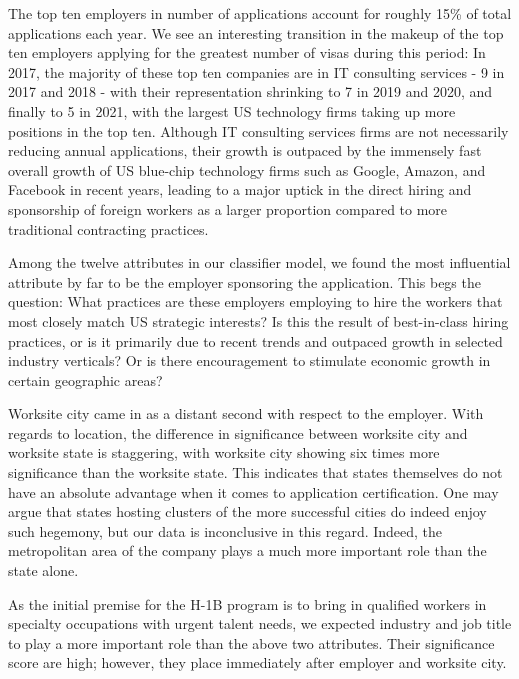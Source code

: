 \documentclass[sigconf]{acmart}
\begin{document}
The top ten employers in number of applications account for roughly 15\% of total applications each year. 
We see an interesting transition in the makeup of the top ten employers applying for the 
greatest number of visas during this period:
In 2017, the majority of these top ten companies are  
in IT consulting services - 9 in 2017 and 2018 - with their representation shrinking to 
7 in 2019 and 2020, and finally to 5 in 2021, with the largest US technology firms taking up more positions 
in the top ten. Although IT consulting services firms are not necessarily reducing annual applications, 
their growth is outpaced by 
the immensely fast overall growth of US blue-chip technology firms such as Google, Amazon, and Facebook 
in recent years, leading to a major uptick in the direct hiring and sponsorship of foreign workers 
as a larger proportion compared to more traditional contracting practices. 



Among the twelve attributes in our classifier model, we found the most influential attribute 
by far to be the employer sponsoring 
the application. This begs the question: What practices are these employers employing 
to hire the workers that most closely match US strategic interests? 
Is this the result of best-in-class hiring practices, or is it primarily due to 
recent trends and outpaced growth in selected industry verticals? 
Or is there encouragement to stimulate economic growth in certain geographic areas? 


Worksite city came in as a distant second with respect to the employer. 
With regards to location, the difference in significance between worksite city 
and worksite state is staggering, with worksite city showing six times more significance 
than the worksite state. This indicates that states themselves do not have an absolute advantage 
when it comes to application certification. One may argue that states hosting clusters of 
the more successful cities do indeed enjoy such hegemony, but our data is inconclusive in this regard.
Indeed, the metropolitan area of the company plays a much more important role than the state alone. 


As the initial premise for the H-1B program is to bring in qualified workers in specialty 
occupations with urgent 
talent needs, we expected industry and job title to play a more important role than 
the above two attributes. Their significance 
score are high; however, they place immediately after employer and worksite city. 
\end{document}
